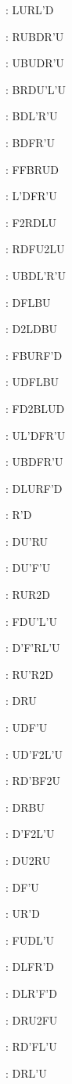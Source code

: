 \documentclass[9pt]{article}
\begin{document}
{\begin{multicols}{6}
: LURL'D

: RUBDR'U

: UBUDR'U

: BRDU'L'U

: BDL'R'U

: BDFR'U

: FFBRUD

: L'DFR'U

: F2RDLU

: RDFU2LU

: UBDL'R'U

: DFLBU

: D2LDBU

: FBURF'D

: UDFLBU

: FD2BLUD

: UL'DFR'U

: UBDFR'U

: DLURF'D

: R'D

: DU'RU

: DU'F'U

: RUR2D

: FDU'L'U

: D'F'RL'U

: RU'R2D

: DRU

: UDF'U

: UD'F2L'U

: RD'BF2U

: DRBU

: D'F2L'U

: DU2RU

: DF'U

: UR'D

: FUDL'U

: DLFR'D

: DLR'F'D

: DRU2FU

: RD'FL'U

: DRL'U


\end{multicols}}
\end{document}
